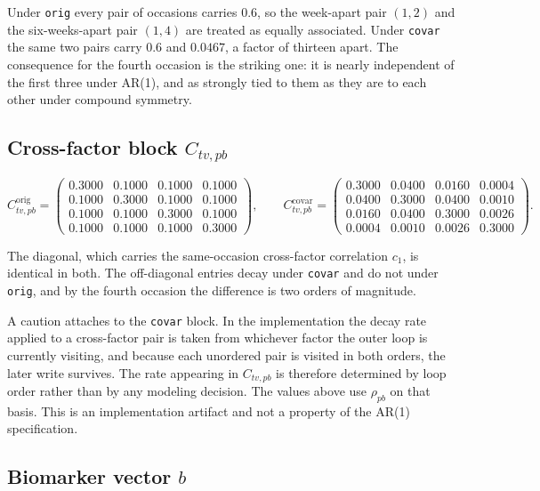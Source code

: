 \documentclass[11pt]{article}
\begin{document}
Under \texttt{orig} every pair of occasions carries $0.6$, so the
week-apart pair $(1,2)$ and the six-weeks-apart pair $(1,4)$ are
treated as equally associated. Under \texttt{covar} the same two pairs
carry $0.6$ and $0.0467$, a factor of thirteen apart. The consequence
for the fourth occasion is the striking one: it is nearly independent
of the first three under AR(1), and as strongly tied to them as they
are to each other under compound symmetry.

\subsection{Cross-factor block $C_{tv,pb}$}

\[
C_{tv,pb}^{\text{orig}} =
\begin{pmatrix}
0.3000 & 0.1000 & 0.1000 & 0.1000 \\
0.1000 & 0.3000 & 0.1000 & 0.1000 \\
0.1000 & 0.1000 & 0.3000 & 0.1000 \\
0.1000 & 0.1000 & 0.1000 & 0.3000
\end{pmatrix},
\qquad
C_{tv,pb}^{\text{covar}} =
\begin{pmatrix}
0.3000 & 0.0400 & 0.0160 & 0.0004 \\
0.0400 & 0.3000 & 0.0400 & 0.0010 \\
0.0160 & 0.0400 & 0.3000 & 0.0026 \\
0.0004 & 0.0010 & 0.0026 & 0.3000
\end{pmatrix}.
\]

The diagonal, which carries the same-occasion cross-factor
correlation $c_1$, is identical in both. The off-diagonal entries
decay under \texttt{covar} and do not under \texttt{orig}, and by the
fourth occasion the difference is two orders of magnitude.

A caution attaches to the \texttt{covar} block. In the implementation
the decay rate applied to a cross-factor pair is taken from whichever
factor the outer loop is currently visiting, and because each
unordered pair is visited in both orders, the later write survives.
The rate appearing in $C_{tv,pb}$ is therefore determined by loop
order rather than by any modeling decision. The values above use
$\rho_{pb}$ on that basis. This is an implementation artifact and not
a property of the AR(1) specification.

\subsection{Biomarker vector $b$}
\end{document}
